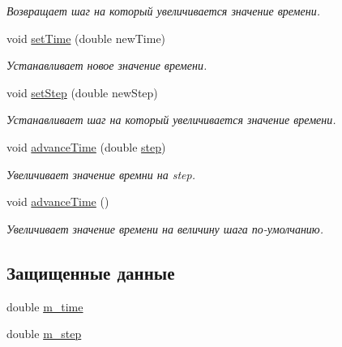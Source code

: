 \begin{DoxyCompactItemize}
\begin{DoxyCompactList}\small\item\em Возвращает шаг на который увеличивается значение времени. \end{DoxyCompactList}\item 
void \hyperlink{class_core_1_1_function_time_a0db96b8aff83af1339e08425fe4fd80b}{set\+Time} (double new\+Time)\hypertarget{class_core_1_1_function_time_a0db96b8aff83af1339e08425fe4fd80b}{}\label{class_core_1_1_function_time_a0db96b8aff83af1339e08425fe4fd80b}

\begin{DoxyCompactList}\small\item\em Устанавливает новое значение времени. \end{DoxyCompactList}\item 
void \hyperlink{class_core_1_1_function_time_ad1a60dab2d7d8a046893751843c13208}{set\+Step} (double new\+Step)\hypertarget{class_core_1_1_function_time_ad1a60dab2d7d8a046893751843c13208}{}\label{class_core_1_1_function_time_ad1a60dab2d7d8a046893751843c13208}

\begin{DoxyCompactList}\small\item\em Устанавливает шаг на который увеличивается значение времени. \end{DoxyCompactList}\item 
void \hyperlink{class_core_1_1_function_time_a1f1674cdfd0a24f69934467369e30267}{advance\+Time} (double \hyperlink{class_core_1_1_function_time_afd6e77dd05e9f0d6377a29084ce41b75}{step})
\begin{DoxyCompactList}\small\item\em Увеличивает значение времни на step. \end{DoxyCompactList}\item 
void \hyperlink{class_core_1_1_function_time_ab2b13d7c42f8a52c2f4ae58efb88ef73}{advance\+Time} ()
\begin{DoxyCompactList}\small\item\em Увеличивает значение времени на величину шага по-\/умолчанию. \end{DoxyCompactList}\end{DoxyCompactItemize}
\subsection*{Защищенные данные}
\begin{DoxyCompactItemize}
\item 
double \hyperlink{class_core_1_1_function_time_a12192d0047976f9cd6376e986e43451c}{m\+\_\+time}
\item 
double \hyperlink{class_core_1_1_function_time_a31d15f7adb8bdecfd22bd35c8fd6eefe}{m\+\_\+step}
\end{DoxyCompactItemize}


